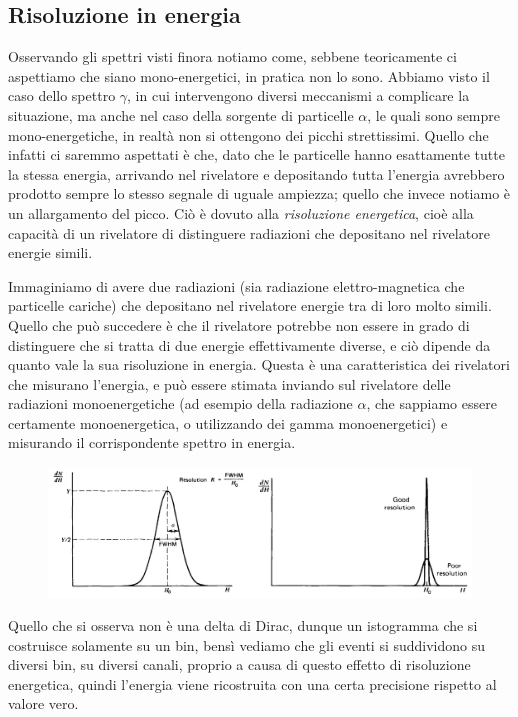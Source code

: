 \subsection{Risoluzione in energia}

Osservando gli spettri visti finora notiamo come, sebbene teoricamente ci aspettiamo che siano mono-energetici, in pratica non lo sono. Abbiamo visto il caso dello spettro $\gamma$, in cui intervengono diversi meccanismi a complicare la situazione, ma anche nel caso della sorgente di particelle $\alpha$, le quali sono sempre mono-energetiche, in realtà non si ottengono dei picchi strettissimi. Quello che infatti ci saremmo aspettati è che, dato che le particelle hanno esattamente tutte la stessa energia, arrivando nel rivelatore e depositando tutta l'energia avrebbero prodotto sempre lo stesso segnale di uguale ampiezza; quello che invece notiamo è un allargamento del picco. Ciò è dovuto alla \textit{risoluzione energetica}, cioè alla capacità di un rivelatore di distinguere radiazioni che depositano nel rivelatore energie simili.

Immaginiamo di avere due radiazioni (sia radiazione elettro-magnetica che particelle cariche) che depositano nel rivelatore energie tra di loro molto simili. Quello che può succedere è che il rivelatore potrebbe non essere in grado di distinguere che si tratta di due energie effettivamente diverse, e ciò dipende da quanto vale la sua risoluzione in energia. Questa è una caratteristica dei rivelatori che misurano l'energia, e può essere stimata inviando sul rivelatore delle radiazioni monoenergetiche (ad esempio della radiazione $\alpha$, che sappiamo essere certamente monoenergetica, o utilizzando dei gamma monoenergetici) e misurando il corrispondente spettro in energia.
\begin{figure}[H]
   \centering
   \includegraphics[width=\textwidth]{immagini/risoluzione_in_energia.png}
\end{figure}
Quello che si osserva non è una delta di Dirac, dunque un istogramma che si costruisce solamente su un bin, bensì vediamo che gli eventi si suddividono su diversi bin, su diversi canali, proprio a causa di questo effetto di risoluzione energetica, quindi l'energia viene ricostruita con una certa precisione rispetto al valore vero.

